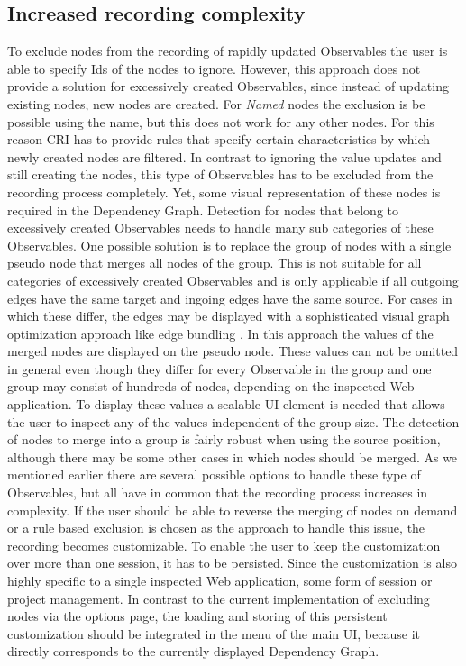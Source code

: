 \subsection{Increased recording complexity}
To exclude nodes from the recording of rapidly updated Observables the user is able to specify Ids of the nodes to ignore. However, this approach does not provide a solution for excessively created Observables, since instead of updating existing nodes, new nodes are created. For \emph{Named} nodes the exclusion is be possible using the name, but this does not work for any other nodes. For this reason CRI has to provide rules that specify certain characteristics by which newly created nodes are filtered. In contrast to ignoring the value updates and still creating the nodes, this type of Observables has to be excluded from the recording process completely. Yet, some visual representation of these nodes is required in the Dependency Graph. Detection for nodes that belong to excessively created Observables needs to handle many sub categories of these Observables. One possible solution is to replace the group of nodes with a single pseudo node that merges all nodes of the group. This is not suitable for all categories of excessively created Observables and is only applicable if all outgoing edges have the same target and ingoing edges have the same source. For cases in which these differ, the edges may be displayed with a sophisticated visual graph optimization approach like edge bundling \cite{EdgeBundling}. In this approach the values of the merged nodes are displayed on the pseudo node. These values can not be omitted in general even though they differ for every Observable in the group and one group may consist of hundreds of nodes, depending on the inspected Web application. To display these values a scalable UI element is needed that allows the user to inspect any of the values independent of the group size. The detection of nodes to merge into a group is fairly robust when using the source position, although there may be some other cases in which nodes should be merged. As we mentioned earlier there are several possible options to handle these type of Observables, but all have in common that the recording process increases in complexity. If the user should be able to reverse the merging of nodes on demand or a rule based exclusion is chosen as the approach to handle this issue, the recording becomes customizable. To enable the user to keep the customization over more than one session, it has to be persisted. Since the customization is also highly specific to a single inspected Web application, some form of session or project management. In contrast to the current implementation of excluding nodes via the options page, the loading and storing of this persistent customization should be integrated in the menu of the main UI, because it directly corresponds to the currently displayed Dependency Graph.
	
